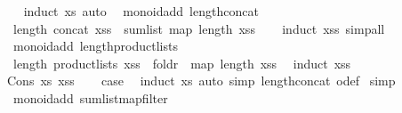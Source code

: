 \begin{isabellebody}
%
\isadelimproof
\ \ %
\endisadelimproof
%
\isatagproof
{}\isamarkupfalse%
\ {\isacharparenleft}{\kern0pt}induct\ xs{\isacharparenright}{\kern0pt}\ auto%
\endisatagproof
{\isafoldproof}%
%
\isadelimproof
\isanewline
%
\endisadelimproof
\isanewline
{}\isamarkupfalse%
\ {\isacharparenleft}{\kern0pt}\ monoid{\isacharunderscore}{\kern0pt}add{\isacharparenright}{\kern0pt}\ length{\isacharunderscore}{\kern0pt}concat{\isacharcolon}{\kern0pt}\isanewline
\ \ {\isachardoublequoteopen}length\ {\isacharparenleft}{\kern0pt}concat\ xss{\isacharparenright}{\kern0pt}\ {\isacharequal}{\kern0pt}\ sum{\isacharunderscore}{\kern0pt}list\ {\isacharparenleft}{\kern0pt}map\ length\ xss{\isacharparenright}{\kern0pt}{\isachardoublequoteclose}\isanewline
%
\isadelimproof
\ \ %
\endisadelimproof
%
\isatagproof
{}\isamarkupfalse%
\ {\isacharparenleft}{\kern0pt}induct\ xss{\isacharparenright}{\kern0pt}\ simp{\isacharunderscore}{\kern0pt}all%
\endisatagproof
{\isafoldproof}%
%
\isadelimproof
\isanewline
%
\endisadelimproof
\isanewline
{}\isamarkupfalse%
\ {\isacharparenleft}{\kern0pt}\ monoid{\isacharunderscore}{\kern0pt}add{\isacharparenright}{\kern0pt}\ length{\isacharunderscore}{\kern0pt}product{\isacharunderscore}{\kern0pt}lists{\isacharcolon}{\kern0pt}\isanewline
\ \ {\isachardoublequoteopen}length\ {\isacharparenleft}{\kern0pt}product{\isacharunderscore}{\kern0pt}lists\ xss{\isacharparenright}{\kern0pt}\ {\isacharequal}{\kern0pt}\ foldr\ {\isacharparenleft}{\kern0pt}{\isacharasterisk}{\kern0pt}{\isacharparenright}{\kern0pt}\ {\isacharparenleft}{\kern0pt}map\ length\ xss{\isacharparenright}{\kern0pt}\ {}{\isachardoublequoteclose}\isanewline
%
\isadelimproof
%
\endisadelimproof
%
\isatagproof
{}\isamarkupfalse%
\ {\isacharparenleft}{\kern0pt}induct\ xss{\isacharparenright}{\kern0pt}\isanewline
\ \ \isamarkupfalse%
\ {\isacharparenleft}{\kern0pt}Cons\ xs\ xss{\isacharparenright}{\kern0pt}\ \isamarkupfalse%
\ \isamarkupfalse%
\ {\isacharquery}{\kern0pt}case\ \isamarkupfalse%
\ {\isacharparenleft}{\kern0pt}induct\ xs{\isacharparenright}{\kern0pt}\ {\isacharparenleft}{\kern0pt}auto\ simp{\isacharcolon}{\kern0pt}\ length{\isacharunderscore}{\kern0pt}concat\ o{\isacharunderscore}{\kern0pt}def{\isacharparenright}{\kern0pt}\isanewline
{}\isamarkupfalse%
\ simp%
\endisatagproof
{\isafoldproof}%
%
\isadelimproof
\isanewline
%
\endisadelimproof
\isanewline
{}\isamarkupfalse%
\ {\isacharparenleft}{\kern0pt}\ monoid{\isacharunderscore}{\kern0pt}add{\isacharparenright}{\kern0pt}\ sum{\isacharunderscore}{\kern0pt}list{\isacharunderscore}{\kern0pt}map{\isacharunderscore}{\kern0pt}filter{\isacharcolon}{\kern0pt}\isanewline

\end{isabellebody}
